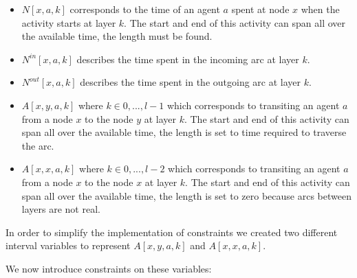 \documentclass[12pt, a4paper, hidelinks]{article}
\numberwithin{equation}{section}
\begin{document}
\begin{itemize}
\item $N[x,a,k]$ corresponds to the time of an agent $a$ spent at node $x$ when the activity starts at layer $k$. The start and end of this activity can span all over the available time, the length must be found.
\item $N^{in}[x,a,k]$ describes the time spent in the incoming arc at layer $k$.
\item $N^{out}[x,a,k]$ describes the time spent in the outgoing arc at layer $k$.
\item $A[x,y,a,k]$ where $k \in {0,...,l-1}$ which corresponds to transiting an agent $a$ from a node $x$ to the node $y$ at layer $k$. The start and end of this activity can span all over the available time, the length is set to time required to traverse the arc.
\item $A[x,x,a,k]$ where $k \in {0,...,l-2}$ which corresponds to transiting an agent $a$ from a node $x$ to the node $x$ at layer $k$. The start and end of this activity can span all over the available time, the length is set to zero because arcs between layers are not real.
\end{itemize}

In order to simplify the implementation of constraints we created two different interval variables to represent $A[x,y,a,k]$ and $A[x,x,a,k]$.

We now introduce constraints on these variables:
\end{document}
